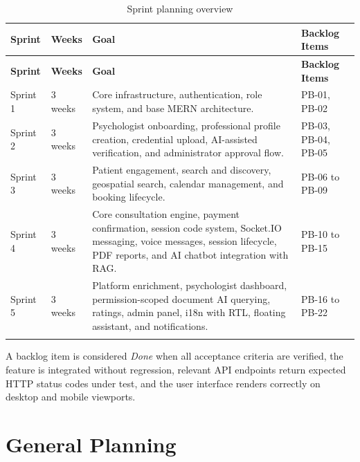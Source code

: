 \documentclass[a4paper,12pt]{report}
\begin{document}
\begin{longtable}{@{} L{1.7cm} L{2.0cm} L{7.0cm} L{3.2cm} @{}}
\toprule
\bfseries Sprint &
\bfseries Weeks &
\bfseries Goal &
\bfseries Backlog Items \\
\midrule
\endfirsthead
\toprule
\bfseries Sprint &
\bfseries Weeks &
\bfseries Goal &
\bfseries Backlog Items \\
\midrule
\endhead

Sprint 1 & 3 weeks & Core infrastructure, authentication, role system, and base MERN architecture. & PB-01, PB-02 \\
\midrule
Sprint 2 & 3 weeks & Psychologist onboarding, professional profile creation, credential upload, AI-assisted verification, and administrator approval flow. & PB-03, PB-04, PB-05 \\
\midrule
Sprint 3 & 3 weeks & Patient engagement, search and discovery, geospatial search, calendar management, and booking lifecycle. & PB-06 to PB-09 \\
\midrule
Sprint 4 & 3 weeks & Core consultation engine, payment confirmation, session code system, Socket.IO messaging, voice messages, session lifecycle, PDF reports, and AI chatbot integration with RAG. & PB-10 to PB-15 \\
\midrule
Sprint 5 & 3 weeks & Platform enrichment, psychologist dashboard, permission-scoped document AI querying, ratings, admin panel, i18n with RTL, floating assistant, and notifications. & PB-16 to PB-22 \\

\bottomrule
\caption{Sprint planning overview}
\label{tab:sprints}\\
\end{longtable}

\noindent
\begin{mdframed}[backgroundcolor=accentblue!10, linecolor=accentblue, linewidth=1pt,
                 innertopmargin=8pt, innerbottommargin=8pt, innerleftmargin=12pt]
A backlog item is considered \textit{Done} when all acceptance criteria are verified, the feature is integrated without regression, relevant API endpoints return expected HTTP status codes under test, and the user interface renders correctly on desktop and mobile viewports.
\end{mdframed}
\clearpage
\section{General Planning}
\end{document}
